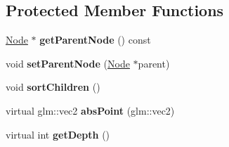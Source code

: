 \subsection*{Protected Member Functions}
\begin{DoxyCompactItemize}
\item 
\mbox{\label{classsage_1_1Node_a6f20a4c713eb7044d63d62fe110ebf39}} 
\mbox{\hyperlink{classsage_1_1Node}{Node}} $\ast$ {\bfseries get\+Parent\+Node} () const
\item 
\mbox{\label{classsage_1_1Node_ad916f8953f6b38ef3514a37f75f9c20d}} 
void {\bfseries set\+Parent\+Node} (\mbox{\hyperlink{classsage_1_1Node}{Node}} $\ast$parent)
\item 
\mbox{\label{classsage_1_1Node_aa7d796f1bad7d0e23a4cdd2575b4b9f3}} 
void {\bfseries sort\+Children} ()
\item 
\mbox{\label{classsage_1_1Node_a5f362ffd1c831c7342a0f103b4636d75}} 
virtual glm\+::vec2 {\bfseries abs\+Point} (glm\+::vec2)
\item 
\mbox{\label{classsage_1_1Node_a303fffee8f70d39603b3a4e251e2e820}} 
virtual int {\bfseries get\+Depth} ()
\end{DoxyCompactItemize}
